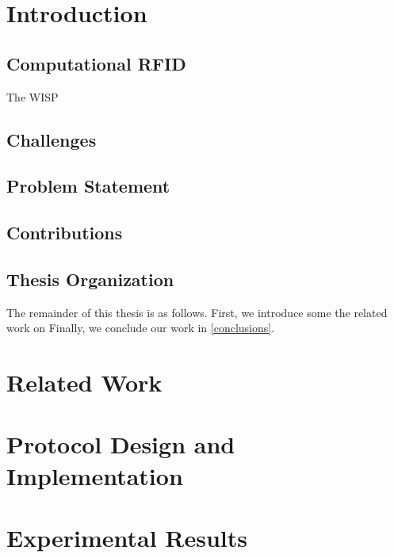 \documentclass[11pt,twoside,a4paper,openright]{report}
\begin{document}
\tableofcontents

\cleardoublepage

\setcounter{page}{1}

\chapter{Introduction}
\label{intro}

\section{Computational RFID}
The WISP \cite{4539485}

\section{Challenges}

\section{Problem Statement}

\section{Contributions}

\section{Thesis Organization}
The remainder of this thesis is as follows.
First, we introduce some the related work on 
Finally, we conclude our work in \cref{conclusions}.

\chapter{Related Work}
\label{relatedwork}


\chapter{Protocol Design and Implementation}
\label{design}


\chapter{Experimental Results}
\label{results}
\end{document}
